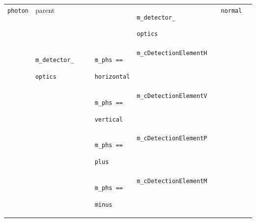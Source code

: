 \begin{footnotesize}
\begin{longtable}[H]{ | m{1.2cm} | m{1.9cm} | m{1.2cm} | l | m{1.5cm} || m{1.8cm} | m{1.4cm} | m{1.2cm} | m{1.7cm} | }
\hline

  \texttt{photon} &
  parent &
  &
  &
  &
  \texttt{m\_detector\_} \par \texttt{optics} &
  &
  \texttt{normal} &
  \\
\cline{2-9}
  &
  \texttt{m\_detector\_} \par \texttt{optics} &
  &
  &
  \texttt{m\_phs ==} \par \texttt{horizontal} &
  \texttt{m\_cDetectionElementH} &
  &
  &
  \\
\cline{5-9}
  &
  &
  &
  &
  \texttt{m\_phs ==} \par \texttt{vertical} &
  \texttt{m\_cDetectionElementV} &
  &
  &
  \\
\cline{5-9}
  &
  &
  &
  &
  \texttt{m\_phs ==} \par \texttt{plus} &
  \texttt{m\_cDetectionElementP} &
  &
  &
  \\
\cline{5-9}
  &
  &
  &
  &
  \texttt{m\_phs ==} \par \texttt{minus} &
  \texttt{m\_cDetectionElementM} &
  &
  &
  \\
  
\hline


\end{longtable}
\end{footnotesize}
